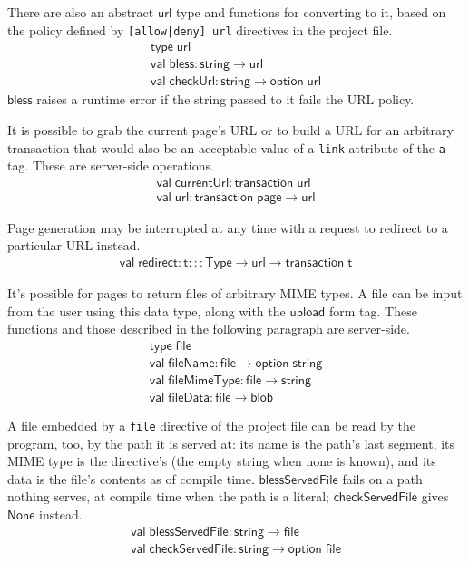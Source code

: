 \documentclass{article}
\newcommand{\mt}[1]{\mathsf{#1}}
\begin{document}
There are also an abstract $\mt{url}$ type and functions for converting to it, based on the policy defined by \texttt{[allow|deny] url} directives in the project file.
$$\begin{array}{l}
  \mt{type} \; \mt{url} \\
  \mt{val} \; \mt{bless} : \mt{string} \to \mt{url} \\
  \mt{val} \; \mt{checkUrl} : \mt{string} \to \mt{option} \; \mt{url}
\end{array}$$
$\mt{bless}$ raises a runtime error if the string passed to it fails the URL policy.

It is possible to grab the current page's URL or to build a URL for an arbitrary transaction that would also be an acceptable value of a \texttt{link} attribute of the \texttt{a} tag.  These are server-side operations.
$$\begin{array}{l}
  \mt{val} \; \mt{currentUrl} : \mt{transaction} \; \mt{url} \\
  \mt{val} \; \mt{url} : \mt{transaction} \; \mt{page} \to \mt{url}
\end{array}$$

Page generation may be interrupted at any time with a request to redirect to a particular URL instead.
$$\begin{array}{l}
  \mt{val} \; \mt{redirect} : \mt{t} ::: \mt{Type} \to \mt{url} \to \mt{transaction} \; \mt{t}
\end{array}$$

It's possible for pages to return files of arbitrary MIME types.  A file can be input from the user using this data type, along with the $\mt{upload}$ form tag.  These functions and those described in the following paragraph are server-side.
$$\begin{array}{l}
  \mt{type} \; \mt{file} \\
  \mt{val} \; \mt{fileName} : \mt{file} \to \mt{option} \; \mt{string} \\
  \mt{val} \; \mt{fileMimeType} : \mt{file} \to \mt{string} \\
  \mt{val} \; \mt{fileData} : \mt{file} \to \mt{blob}
\end{array}$$

A file embedded by a \texttt{file} directive of the project file can be read by the program, too, by the path it is served at: its name is the path's last segment, its MIME type is the directive's (the empty string when none is known), and its data is the file's contents as of compile time.  $\mt{blessServedFile}$ fails on a path nothing serves, at compile time when the path is a literal; $\mt{checkServedFile}$ gives $\mt{None}$ instead.
$$\begin{array}{l}
  \mt{val} \; \mt{blessServedFile} : \mt{string} \to \mt{file} \\
  \mt{val} \; \mt{checkServedFile} : \mt{string} \to \mt{option} \; \mt{file}
\end{array}$$
\end{document}
